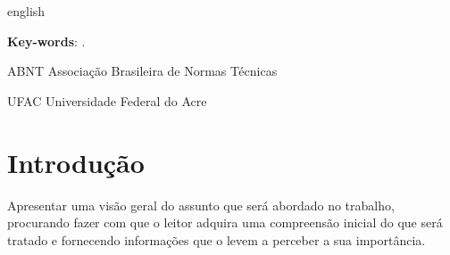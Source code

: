 \documentclass[
	12pt,				    %
	openright,			    %
	oneside,			    %
	a4paper,			    %
    sumario=tradicional,    %
	english,			    %
	brazil,				    %
	]{abntex2}
\begin{document}
\begin{resumo}[Abstract]
 \begin{otherlanguage*}{english}
   \noindent

   \vspace{\onelineskip}

   \noindent
   \textbf{Key-words}: .
 \end{otherlanguage*}
\end{resumo}

\listoffigures*
\cleardoublepage

\listoftables*
\cleardoublepage



\begin{siglas}
\item[ABNT] Associação Brasileira de Normas Técnicas
\item[UFAC] Universidade Federal do Acre
\end{siglas}




\tableofcontents*
\cleardoublepage



\textual


\chapter{Introdução}\label{sec:introducao} \thispagestyle{empty}
Apresentar uma visão geral do assunto que será abordado no trabalho, procurando fazer com que o leitor adquira uma compreensão inicial do que será tratado e fornecendo informações que o levem a perceber a sua importância.  
\end{document}
